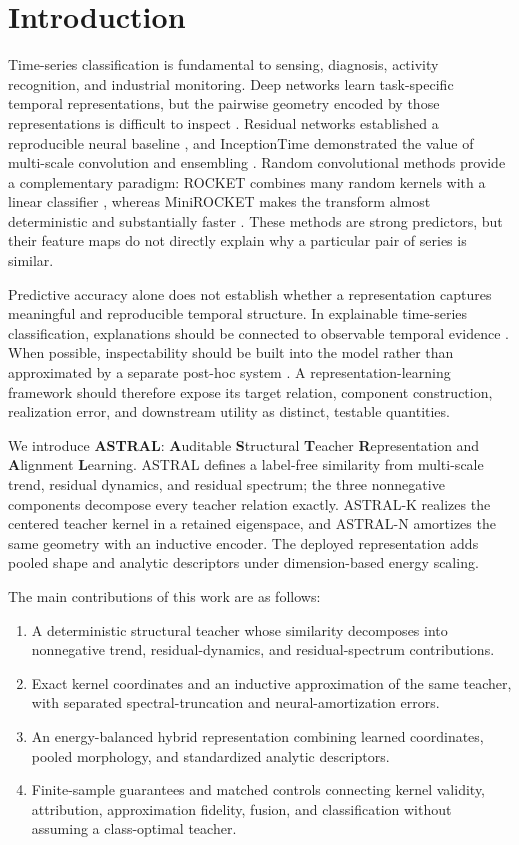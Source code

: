 \documentclass[pdflatex,sn-mathphys-num]{sn-jnl}
\newcommand{\1}{\mathbf{1}}
\theoremstyle{plain}
\begin{document}
	\section{Introduction}
	
	Time-series classification is fundamental to sensing, diagnosis, activity recognition, and industrial monitoring. Deep networks learn task-specific temporal representations, but the pairwise geometry encoded by those representations is difficult to inspect \cite{fawaz2019review}. Residual networks established a reproducible neural baseline \cite{wang2017scratch}, and InceptionTime demonstrated the value of multi-scale convolution and ensembling \cite{fawaz2020inceptiontime}. Random convolutional methods provide a complementary paradigm: ROCKET combines many random kernels with a linear classifier \cite{dempster2020rocket}, whereas MiniROCKET makes the transform almost deterministic and substantially faster \cite{dempster2021minirocket}. These methods are strong predictors, but their feature maps do not directly explain why a particular pair of series is similar.
	
	Predictive accuracy alone does not establish whether a representation captures meaningful and reproducible temporal structure. In explainable time-series classification, explanations should be connected to observable temporal evidence \cite{theissler2022xai}. When possible, inspectability should be built into the model rather than approximated by a separate post-hoc system \cite{rudin2019interpretable}. A representation-learning framework should therefore expose its target relation, component construction, realization error, and downstream utility as distinct, testable quantities.
	
	We introduce \textbf{ASTRAL}: \textbf{A}uditable \textbf{S}tructural \textbf{T}eacher \textbf{R}epresentation and \textbf{A}lignment \textbf{L}earning. ASTRAL defines a label-free similarity from multi-scale trend, residual dynamics, and residual spectrum; the three nonnegative components decompose every teacher relation exactly. ASTRAL-K realizes the centered teacher kernel in a retained eigenspace, and ASTRAL-N amortizes the same geometry with an inductive encoder. The deployed representation adds pooled shape and analytic descriptors under dimension-based energy scaling.
	
	The main contributions of this work are as follows:
	\begin{enumerate}
		\item A deterministic structural teacher whose similarity decomposes into nonnegative trend, residual-dynamics, and residual-spectrum contributions.
		\item Exact kernel coordinates and an inductive approximation of the same teacher, with separated spectral-truncation and neural-amortization errors.
		\item An energy-balanced hybrid representation combining learned coordinates, pooled morphology, and standardized analytic descriptors.
		\item Finite-sample guarantees and matched controls connecting kernel validity, attribution, approximation fidelity, fusion, and classification without assuming a class-optimal teacher.
	\end{enumerate}
\end{document}
